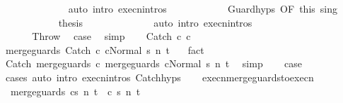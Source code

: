 \begin{isabellebody}
\ \ \ \ \ \ \ \ \ \ \ \ \isamarkupfalse%
\ {\isacharparenleft}auto\ intro{\isacharcolon}\ execn{\isachardot}intros{\isacharparenright}\isanewline
\ \ \ \ \ \ \ \ \ \ \isamarkupfalse%
\ Guard{\isachardot}hyps\ {\isacharbrackleft}OF\ this{\isacharbrackright}\ s{\isacharunderscore}in{\isacharunderscore}g\isanewline
\ \ \ \ \ \ \ \ \ \ \isamarkupfalse%
\ {\isacharquery}thesis\isanewline
\ \ \ \ \ \ \ \ \ \ \ \ \isamarkupfalse%
\ {\isacharparenleft}auto\ intro{\isacharcolon}\ execn{\isachardot}intros{\isacharparenright}\isanewline
\ \ \ \ \ \ \ \ \isamarkupfalse%
\isanewline
\ \ \ \ \ \ \isamarkupfalse%
\isanewline
\ \ \ \ \isamarkupfalse%
\isanewline
\ \ \isamarkupfalse%
\isanewline
{}\isamarkupfalse%
\isanewline
\ \ \isamarkupfalse%
\ Throw\ \isamarkupfalse%
\ {\isacharquery}case\ \isamarkupfalse%
\ simp\isanewline
{}\isamarkupfalse%
\isanewline
\ \ \isamarkupfalse%
\ {\isacharparenleft}Catch\ c{}\ c{}{\isacharparenright}\isanewline
\ \ \isamarkupfalse%
\ {\isachardoublequoteopen}{\isasymGamma}{\isasymturnstile}{\isasymlangle}merge{\isacharunderscore}guards\ {\isacharparenleft}Catch\ c{}\ c{}{\isacharparenright}{\isacharcomma}Normal\ s{\isasymrangle}\ {\isacharequal}n{\isasymRightarrow}\ t{\isachardoublequoteclose}\ \ \isamarkupfalse%
\ fact\isanewline
\ \ \isamarkupfalse%
\ {\isachardoublequoteopen}{\isasymGamma}{\isasymturnstile}{\isasymlangle}Catch\ {\isacharparenleft}merge{\isacharunderscore}guards\ c{}{\isacharparenright}\ {\isacharparenleft}merge{\isacharunderscore}guards\ c{}{\isacharparenright}{\isacharcomma}Normal\ s{\isasymrangle}\ {\isacharequal}n{\isasymRightarrow}\ t{\isachardoublequoteclose}\ \isamarkupfalse%
\ simp\isanewline
\ \ \isamarkupfalse%
\ {\isacharquery}case\isanewline
\ \ \ \ \isamarkupfalse%
\ cases\ {\isacharparenleft}auto\ intro{\isacharcolon}\ execn{\isachardot}intros\ Catch{\isachardot}hyps{\isacharparenright}\isanewline
{}\isamarkupfalse%
%
\endisatagproof
{\isafoldproof}%
%
\isadelimproof
\isanewline
%
\endisadelimproof
\ \ \isanewline
{}\isamarkupfalse%
\ execn{\isacharunderscore}merge{\isacharunderscore}guards{\isacharunderscore}to{\isacharunderscore}execn{\isacharcolon}\isanewline
\ \ {\isachardoublequoteopen}{\isasymGamma}{\isasymturnstile}{\isasymlangle}merge{\isacharunderscore}guards\ c{\isacharcomma}s{\isasymrangle}\ {\isacharequal}n{\isasymRightarrow}\ t\ {\isasymLongrightarrow}\ {\isasymGamma}{\isasymturnstile}{\isasymlangle}c{\isacharcomma}\ s{\isasymrangle}\ {\isacharequal}n{\isasymRightarrow}\ t{\isachardoublequoteclose}\ \isanewline

\end{isabellebody}

